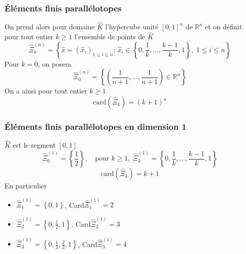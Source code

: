 \documentclass{beamer}
\begin{document}
\begin{frame}
\frametitle{Éléments finis parallélotopes}


   On prend alors pour domaine $\widehat{K}$ l'hypercube unité $[0, 1]^n$ de $\mathbb{R}^n$ et on définit pour tout entier $k \geq 1$ l'ensemble de points de $\widehat{K}$
\begin{equation}
\widehat{\Xi}_k^{(n)}=\left\{\hat{x}=(\hat{x}_i)_{1\leq i\leq n};\, \hat{x}_i\in\left\{0,\frac 1k,...,\frac{k-1}{k},1\right\},\; 1\leq i\leq n\right\}
\end{equation}
Pour $k=0$, on posera  
\begin{equation}
\widehat{\Xi}_0^{(n)}=\left\{\left(\frac 1{n+1},...,\frac 1{n+1}\right)\in \mathbb{R}^n \right\}
\end{equation}
On a ainsi pour tout entier  $k\geq 1$                                                                                            \[\mbox{card} (\widehat{\Xi}_k) =  (k+ 1)^n\]
\end{frame}
\begin{frame}
\frametitle{Éléments finis parallélotopes en dimension 1}
 $\widehat{K}$ est le segment $[0, 1]$ 
\[
\widehat{\Xi}_0^{(1)}=\left\{\frac 1{2}\right\},\quad \mbox{pour }k \geq 1, \; \widehat{\Xi}_k^{(1)}=\left\{0,\frac 1k,...,\frac{k-1}{k},1\right\}
\]
 \[\mbox{card} (\widehat{\Xi}_k) =  k+ 1\] En particulier
 \begin{itemize}
\item $\widehat{\Xi}_1^{(1)}=\left\{0,1\right\}$, Card$\widehat{\Xi}_1^{(1)}=2$
\item $\widehat{\Xi}_2^{(1)}=\left\{0,\frac 12,1\right\}$, Card$\widehat{\Xi}_2^{(1)}=3$
\item $\widehat{\Xi}_3^{(1)}=\left\{0,\frac 13,\frac 23,1\right\}$, Card$\widehat{\Xi}_3^{(1)}=4$
 \end{itemize}
\end{frame}
\end{document}
